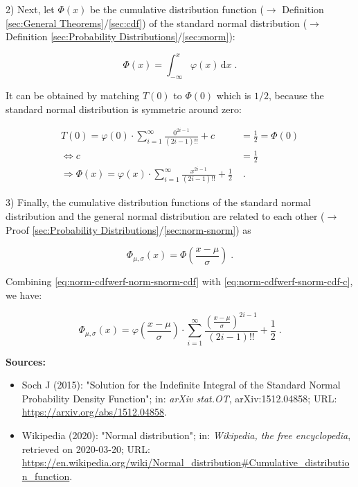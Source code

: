 \documentclass[a4paper,12pt,twoside]{book}
\begin{document}
2) Next, let $\Phi(x)$ be the cumulative distribution function ($\rightarrow$ Definition \ref{sec:General Theorems}/\ref{sec:cdf}) of the standard normal distribution ($\rightarrow$ Definition \ref{sec:Probability Distributions}/\ref{sec:snorm}):

\begin{equation} \label{eq:norm-cdfwerf-snorm-cdf}
\Phi(x) = \int_{-\infty}^x \varphi(x) \, \mathrm{d}x \; .
\end{equation}

It can be obtained by matching $T(0)$ to $\Phi(0)$ which is $1/2$, because the standard normal distribution is symmetric around zero:

\begin{equation} \label{eq:norm-cdfwerf-snorm-cdf-c}
\begin{split}
T(0) = \varphi(0) \cdot \sum_{i=1}^{\infty} \frac{0^{2i-1}}{(2i-1)!!} + c &= \frac{1}{2} = \Phi(0) \\
\Leftrightarrow c &= \frac{1}{2} \\
\Rightarrow \Phi(x) = \varphi(x) \cdot \sum_{i=1}^{\infty} \frac{x^{2i-1}}{(2i-1)!!} + \frac{1}{2} \! &\; .
\end{split}
\end{equation}

3) Finally, the cumulative distribution functions of the standard normal distribution and the general normal distribution are related to each other ($\rightarrow$ Proof \ref{sec:Probability Distributions}/\ref{sec:norm-snorm}) as

\begin{equation} \label{eq:norm-cdfwerf-norm-snorm-cdf}
\Phi_{\mu,\sigma}(x) = \Phi\left( \frac{x-\mu}{\sigma} \right) \; .
\end{equation}

Combining \eqref{eq:norm-cdfwerf-norm-snorm-cdf} with \eqref{eq:norm-cdfwerf-snorm-cdf-c}, we have:

\begin{equation} \label{eq:norm-cdfwerf-norm-cdf-qed}
\Phi_{\mu,\sigma}(x) = \varphi\left( \frac{x-\mu}{\sigma} \right) \cdot \sum_{i=1}^{\infty} \frac{\left( \frac{x-\mu}{\sigma} \right)^{2i-1}}{(2i-1)!!} + \frac{1}{2} \; .
\end{equation}


\vspace{1em}
\textbf{Sources:}
\begin{itemize}
\item Soch J (2015): "Solution for the Indefinite Integral of the Standard Normal Probability Density Function"; in: \textit{arXiv stat.OT}, arXiv:1512.04858; URL: \url{https://arxiv.org/abs/1512.04858}.
\item Wikipedia (2020): "Normal distribution"; in: \textit{Wikipedia, the free encyclopedia}, retrieved on 2020-03-20; URL: \url{https://en.wikipedia.org/wiki/Normal_distribution#Cumulative_distribution_function}.
\end{itemize}
\end{document}
